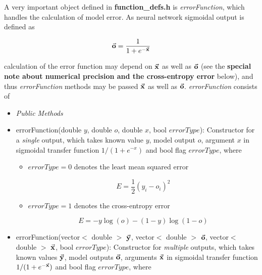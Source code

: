 \documentclass{report}
\begin{document}
A very important object defined in {\bf function\_defs.h} is {\em
errorFunction}, which handles the calculation of model error.  As
neural network sigmoidal output is defined as

\begin{displaymath}
\vec{\bf{o}} = \frac{1}{1+e^{-\vec{\bf{x}}}}
\end{displaymath}

calculation of the error function may depend on $\vec{\bf{x}}$ as well
as $\vec{\bf{o}}$ (see the {\bf special note about numerical precision
and the cross-entropy error} below),
 and thus {\em errorFunction}
methods may be passed $\vec{\bf{x}}$ as well as $\vec{\bf{o}}$.
{\em errorFunction} consists of

\begin{itemize}

\item {\em Public Methods}

\item errorFunction(double $y$, double $o$, double $x$, bool
      $errorType$): Constructor for a {\em single} output, which takes
      known value $y$, model output $o$, argument $x$ in sigmoidal
      transfer function $1/(1+e^{-x})$ and bool flag $errorType$,
      where

\begin{itemize}

\item $errorType = 0$ denotes the least mean squared error

\begin{displaymath}
E = \frac{1}{2} (y_i - o_i)^2
\end{displaymath}

\item $errorType = 1$ denotes the cross-entropy error

\begin{displaymath}
E = -y\log(o)-(1-y)\log(1-o)
\end{displaymath}

\end{itemize}

\item errorFunction(vector$<$ double $>$ $\vec{\bf y}$, vector$<$
      double $>$ $\vec{\bf o}$, vector$<$ double $>$ $\vec{\bf x}$,
      bool $errorType$): Constructor for {\em multiple} outputs, which
      takes known values $\vec{\bf y}$, model outputs $\vec{\bf o}$,
      arguments $\vec{\bf x}$ in sigmoidal transfer function
      $1/(1+e^{-\vec{\bf x}})$ and bool flag $errorType$, where


\end{itemize}
\end{document}
